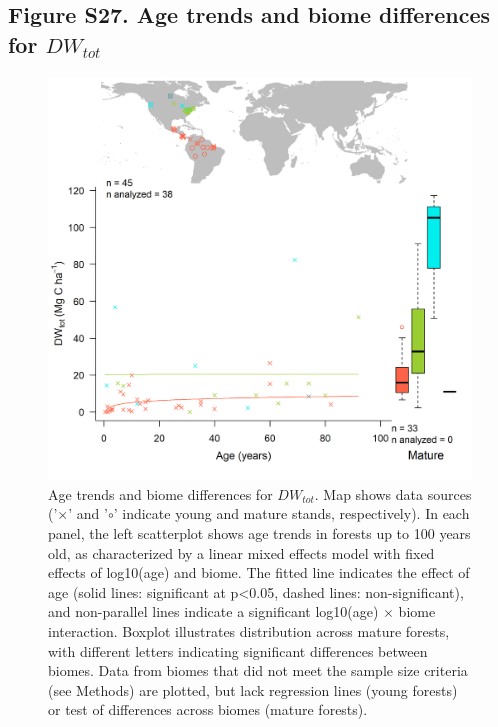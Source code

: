 \documentclass[
]{article}
\begin{document}
\newpage

\hypertarget{figure-s27.-age-trends-and-biome-differences-for-dw_tot}{%
\subsection{\texorpdfstring{Figure S27. Age trends and biome differences
for
\(DW_{tot}\)}{Figure S27. Age trends and biome differences for DW\_\{tot\}}}\label{figure-s27.-age-trends-and-biome-differences-for-dw_tot}}

\begin{figure}[H]

{\centering \includegraphics[width=1\linewidth]{tables_figures/age_trends/deadwood_with_map} 

}

\caption{Age trends and biome differences for $DW_{tot}$. Map shows data sources ('$\times$' and '$\circ$' indicate young and mature stands, respectively). In each panel, the left scatterplot shows age trends in forests up to 100 years old, as characterized by a linear mixed effects model with fixed effects of log10(age) and biome. The fitted line indicates the effect of age (solid lines: significant at p<0.05, dashed lines: non-significant), and non-parallel lines indicate a significant log10(age) $\times$ biome interaction. Boxplot illustrates distribution across mature forests, with different letters indicating significant differences between biomes. Data from biomes that did not meet the sample size criteria (see Methods) are plotted, but lack regression lines (young forests) or test of differences across biomes (mature forests).}\label{fig:unnamed-chunk-30}
\end{figure}
\end{document}
